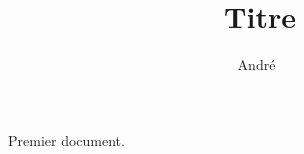 \documentclass[a4paper, french, 12pt]{article}
\title{Titre}
\author{André~\bsc{Dewèvre}}
\date{}
\begin{document}
\maketitle

Premier document.
\end{document}
